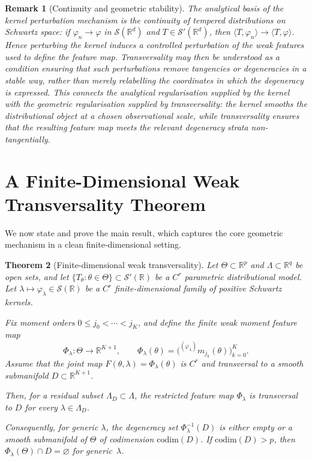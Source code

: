 \documentclass[11pt,a4paper]{article}
\newtheorem{theorem}{Theorem}[section]
\newtheorem{remark}[theorem]{Remark}
\newcommand{\R}{\mathbb{R}}
\newcommand{\cS}{\mathcal{S}}
\begin{document}
\begin{remark}[Continuity and geometric stability]
\label{rem:continuity_perturbation}
The analytical basis of the kernel perturbation mechanism is the
continuity of tempered distributions on Schwartz space: if
$\varphi_n \to \varphi$ in $\cS(\R^d)$ and $T \in \cS'(\R^d)$, then
$\langle T, \varphi_n \rangle \to \langle T, \varphi \rangle$.  Hence
perturbing the kernel induces a controlled perturbation of the weak
features used to define the feature map.  Transversality may then be
understood as a condition ensuring that such perturbations remove
tangencies or degeneracies in a stable way, rather than merely
relabelling the coordinates in which the degeneracy is expressed.
This connects the analytical regularisation supplied by the kernel with
the geometric regularisation supplied by transversality: the kernel
smooths the distributional object at a chosen observational scale,
while transversality ensures that the resulting feature map meets the
relevant degeneracy strata non-tangentially.
\end{remark}


\section{A Finite-Dimensional Weak Transversality Theorem}
\label{sec:finite_dim_thm}

We now state and prove the main result, which captures the core
geometric mechanism in a clean finite-dimensional setting.

\begin{theorem}[Finite-dimensional weak transversality]
\label{thm:main}
Let $\Theta \subset \R^p$ and $\Lambda \subset \R^q$ be open sets,
and let $\{T_\theta:\theta\in\Theta\}\subset \cS'(\R)$ be a $C^r$
parametric distributional model.  Let
$\lambda \mapsto \varphi_\lambda \in \cS(\R)$ be a $C^r$
finite-dimensional family of positive Schwartz kernels.

Fix moment orders $0\leq j_0<\cdots<j_K$, and define the finite
weak moment feature map
\[
  \Phi_\lambda:\Theta\to \R^{K+1},
  \qquad
  \Phi_\lambda(\theta)
  =
  \bigl(
  {}^{(\varphi_\lambda)}\!m_{j_k}(\theta)
  \bigr)_{k=0}^{K}.
\]
Assume that the joint map
$F(\theta,\lambda)=\Phi_\lambda(\theta)$ is $C^r$ and transversal to
a smooth submanifold $D\subset \R^{K+1}$.

Then, for a residual subset $\Lambda_D\subset\Lambda$, the
restricted feature map $\Phi_\lambda$ is transversal to $D$ for
every $\lambda\in\Lambda_D$.

Consequently, for generic $\lambda$, the degeneracy set
$\Phi_\lambda^{-1}(D)$ is either empty or a smooth submanifold of
$\Theta$ of codimension $\mathrm{codim}(D)$.  If
$\mathrm{codim}(D) > p$, then
$\Phi_\lambda(\Theta)\cap D = \varnothing$ for generic~$\lambda$.
\end{theorem}
\end{document}

